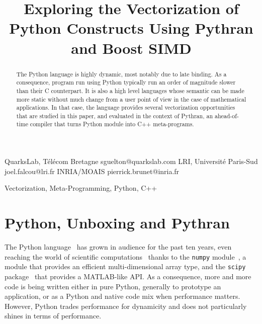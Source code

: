 \documentclass[preprint]{sigplanconf}
\begin{document}
\setlength{\pdfpageheight}{\paperheight}
\setlength{\pdfpagewidth}{\paperwidth}


\title{Exploring the Vectorization of Python Constructs Using Pythran and Boost SIMD}

           {QuarksLab, T{\'e}l{\'e}com Bretagne}
           {sguelton@quarkslab.com}
           {LRI, Universit\'e Paris-Sud}
           {joel.falcou@lri.fr}
           {INRIA/MOAIS}
           {pierrick.brunet@inria.fr}

\maketitle

\begin{abstract}

    The Python language is highly dynamic, most notably due to late binding. As
    a consequence, program run using Python typically run an order of magnitude
    slower than their C counterpart. It is also a high level languages whose
    semantic can be made more static without much change from a user point of
    view in the case of mathematical applications. In that case, the language
    provides several vectorization opportunities that are studied in this
    paper, and evaluated in the context of Pythran, an ahead-of-time compiler
    that turns Python module into C++ meta-programs.

\end{abstract}



\keywords
Vectorization, Meta-Programming, Python, C++


\section{Python, Unboxing and Pythran}

The Python language~\cite{rossum97} has grown in audience for the past ten
years, even reaching the world of scientific computations~\cite{oliphant2007}
thanks to the \texttt{numpy} module~\cite{numpyarray2011}, a module that
provides an efficient multi-dimensional array type, and the \texttt{scipy}
package~\cite{scipy} that provides a MATLAB-like API. As a consequence, more
and more code is being written either in pure Python, generally to prototype an
application, or as a Python and native code mix when performance matters.
However, Python trades performance for dynamicity and does not particularly
shines in terms of performance.
\end{document}
